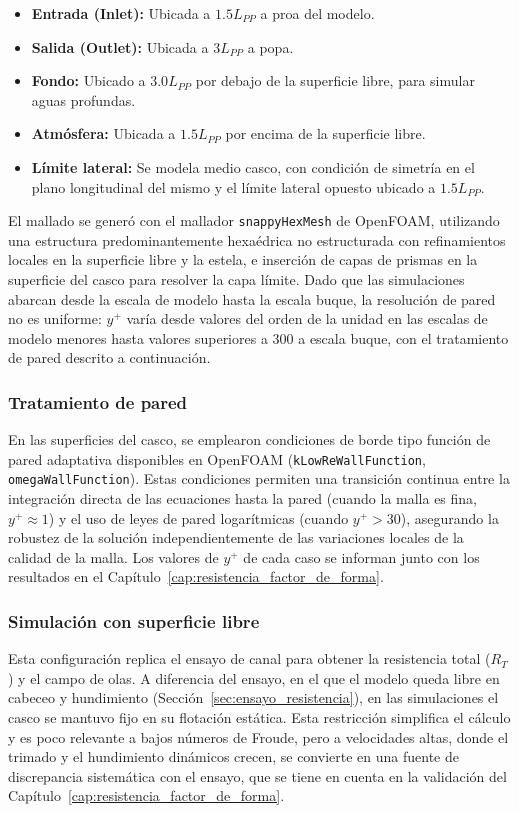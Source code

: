 \begin{itemize}
    \item \textbf{Entrada (Inlet):} Ubicada a $1.5 L_{PP}$ a proa del modelo.
    \item \textbf{Salida (Outlet):} Ubicada a $3 L_{PP}$ a popa.
    \item \textbf{Fondo:} Ubicado a $3.0 L_{PP}$ por debajo de la superficie libre, para simular aguas profundas.
    \item \textbf{Atmósfera:} Ubicada a $1.5 L_{PP}$ por encima de la superficie libre.
    \item \textbf{Límite lateral:} Se modela medio casco, con condición de simetría en el plano longitudinal del mismo y el límite lateral opuesto ubicado a $1.5 L_{PP}$.
\end{itemize}

El mallado se generó con el mallador \texttt{snappyHexMesh} de OpenFOAM,
utilizando una estructura predominantemente hexaédrica no estructurada con
refinamientos locales en la superficie libre y la estela, e inserción de capas de
prismas en la superficie del casco para resolver la capa límite. Dado que las
simulaciones abarcan desde la escala de modelo hasta la escala buque, la
resolución de pared no es uniforme: $y^+$ varía desde valores del orden de la
unidad en las escalas de modelo menores hasta valores superiores a 300 a escala
buque, con el tratamiento de pared descrito a continuación.

\subsubsection{Tratamiento de pared}
{\sloppy
En las superficies del casco, se emplearon condiciones de borde tipo función de
pared adaptativa disponibles en OpenFOAM (\texttt{kLowReWallFunction},
\texttt{omegaWallFunction}). Estas condiciones permiten una transición continua
entre la integración directa de las ecuaciones hasta la pared (cuando la malla es
fina, $y^+ \approx 1$) y el uso de leyes de pared logarítmicas (cuando
$y^+ > 30$), asegurando la robustez de la solución independientemente de las
variaciones locales de la calidad de la malla. Los valores de $y^+$ de cada caso
se informan junto con los resultados en el
Capítulo~\ref{cap:resistencia_factor_de_forma}.
\par}

\subsubsection{Simulación con superficie libre}
Esta configuración replica el ensayo de canal para obtener la resistencia total ($R_T$) y el campo de olas. A diferencia del ensayo, en el que el modelo queda libre en cabeceo y hundimiento (Sección~\ref{sec:ensayo_resistencia}), en las simulaciones el casco se mantuvo fijo en su flotación estática. Esta restricción simplifica el cálculo y es poco relevante a bajos números de Froude, pero a velocidades altas, donde el trimado y el hundimiento dinámicos crecen, se convierte en una fuente de discrepancia sistemática con el ensayo, que se tiene en cuenta en la validación del Capítulo~\ref{cap:resistencia_factor_de_forma}.

